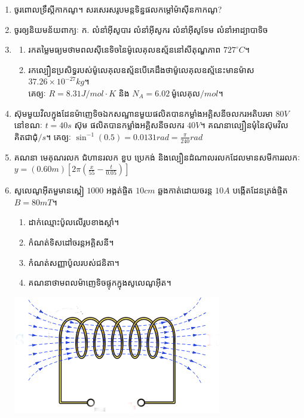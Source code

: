 \documentclass{officialexam}
\begin{document}
\begin{enumerate}[I]
	\item ចូរពោលទ្រឹស្តីកាកណូ។ សរសេរសរូបមន្តទិន្នផលកម្តៅម៉ាសុីនកាកណូ?
	\item ចូរឲ្យនិយមន័យពាក្យៈ {\color{khtug}ក.} លំនាំអុីសូបារ លំនាំអុីសូករ លំនាំអុីសូទែម លំនាំអាដ្យាបាទិច
	\item \begin{enumerate}[k]
		\item រកតម្លៃមធ្យមថាមពលសុីនេទិចនៃម៉ូលេគុលឧស្ម័ននៅសីតុណ្ហភាព $727^\circ C$។
		\item រកល្បឿនប្រសិទ្ធរបស់ម៉ូលេគុលឧស្ម័នបើគេដឹងថាម៉ូលេគុលឧស្ម័នេះមានម៉ាស $37.26\times10^{-27}kg$។ \\គេឲ្យៈ $R=8.31J/mol\cdot K$ និង $N_{A}=6.02~\text{ម៉ូលេគុល}/mol$។
	\end{enumerate}
	\item ស៊ុមមួយវិលក្នុងដែនម៉ាញេទិចឯកសណ្ឋានមួយផលិតបានកម្លាំងអគ្គិសនីចលករអតិបរមា $80V$ នៅខណៈ $t=40s$ ស៊ុម ផលិតបានកម្លាំងអគ្គិសនីចលករ $40V$។ គណនាល្បឿនមុំនៃស៊ុមវិល គិតជាជុំ$/s$។ គេឲ្យៈ $\sin^{-1}\left(0.5\right)=0.0131rad=\frac{\pi}{240}rad$
	\item គណនា មេគុណរលក ជំហានរលក ខួប ប្រេកង់ និងល្បឿនដំណាលរលកដែលមានសមីការរលកៈ $y=\left(0.60m\right)\left[2\pi\left(\frac{x}{55}-\frac{t}{0.05}\right)\right]$
	\item សូលេណូអុីតមួមានស្ពៀ $1000$ អង្កត់ផ្ចិត $10cm$ ឆ្លងកាត់ដោយចរន្ត $10A$ បង្កើតដែនត្រង់ផ្ចិត $B=80mT$។
	\begin{multicols}{2}
		\begin{enumerate}[k]
			\item ដាក់ឈ្មោះប៉ូលលើរូបខាងស្តាំ។
			\item កំណត់ទិសដៅចរន្តអគ្គិសនី។
			\item កំណត់សញ្ញាប៉ូលរបស់ជនិតា។
			\item គណនាថាមពលម៉ាញេទិចផ្ទុកក្នុងសូលេណូអុីត។
		\end{enumerate} 
		\includegraphics[scale=0.5]{image7}
	\end{multicols}

\end{enumerate}
\end{document}
